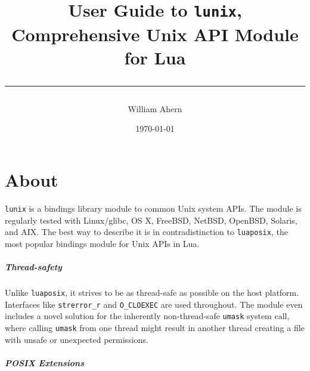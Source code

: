 \documentclass[11pt, oneside]{memoir}
\newcommand*{\lunix}[0]{\texttt{lunix}\xspace}
\newcommand*{\luaposix}[0]{\texttt{luaposix}\xspace}
\newcommand*{\fn}[1]{\texttt{#1}\xspace}
\newcommand*{\const}[1]{\texttt{#1}\xspace}
\begin{document}

\title{

\vspace*{10ex}

\HUGE\sffamily User Guide to \lunix, \\


\HUGE Comprehensive Unix API Module for Lua \\

\vspace*{30pt}
\hrule
}

\date{\today}
\author{William Ahern}
\maketitle
\thispagestyle{empty}
\clearpage

\setcounter{page}{1}
\tableofcontents

\clearpage

\setcounter{page}{1}

\setlength{\beforechapskip}{1ex}
\setlength{\afterchapskip}{1ex}

\chapter{About}

\lunix is a bindings library module to common Unix system APIs. The module is regularly tested with Linux/glibc, OS X, FreeBSD, NetBSD, OpenBSD, Solaris, and AIX. The best way to describe it is in contradistinction to \luaposix, the most popular bindings module for Unix APIs in Lua.

\paragraph{Thread-safety}

Unlike \luaposix, it strives to be as thread-safe as possible on the host platform. Interfaces like \fn{strerror\_r} and \const{O\_CLOEXEC} are used throughout. The module even includes a novel solution for the inherently non-thread-safe \fn{umask} system call, where calling \fn{umask} from one thread might result in another thread creating a file with unsafe or unexpected permissions.

\paragraph{POSIX Extensions}
\end{document}
